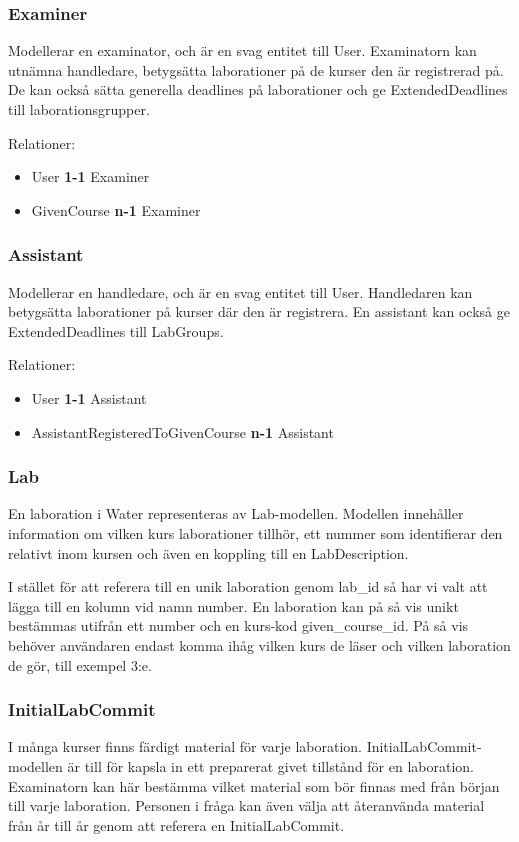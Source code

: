 \subsubsection{Examiner}
Modellerar en examinator, och är en svag entitet till User. Examinatorn kan utnämna handledare, betygsätta laborationer på de kurser den är registrerad på. De kan också sätta generella deadlines på laborationer och ge ExtendedDeadlines till laborationsgrupper.  

Relationer: 
\begin{itemize}
  \item User {\bf 1-1} Examiner 
  \item GivenCourse {\bf n-1} Examiner 
\end{itemize}

\subsubsection{Assistant}
Modellerar en handledare, och är en svag entitet till User. Handledaren kan betygsätta laborationer på kurser där den är registrera. En assistant kan också ge ExtendedDeadlines till LabGroups. 

Relationer: 
\begin{itemize}
  \item User {\bf 1-1} Assistant 
  \item AssistantRegisteredToGivenCourse {\bf n-1} Assistant 
\end{itemize}

\subsubsection{Lab}
En laboration i Water representeras av Lab-modellen. Modellen innehåller information om vilken kurs laborationer tillhör, ett nummer som identifierar den relativt inom kursen och även en koppling till en LabDescription.

I stället för att referera till en unik laboration genom lab\_id så har vi valt att lägga till en kolumn vid namn number. En laboration kan på så vis unikt bestämmas utifrån ett number och en kurs-kod given\_course\_id. På så vis behöver användaren endast komma ihåg vilken kurs de läser och vilken laboration de gör, till exempel 3:e.

\subsubsection{InitialLabCommit}
I många kurser finns färdigt material för varje laboration. InitialLabCommit-modellen är till för kapsla in ett preparerat givet tillstånd för en laboration. Examinatorn kan här bestämma vilket material som bör finnas med från början till varje laboration. Personen i fråga kan även välja att återanvända material från år till år genom att referera en InitialLabCommit.

